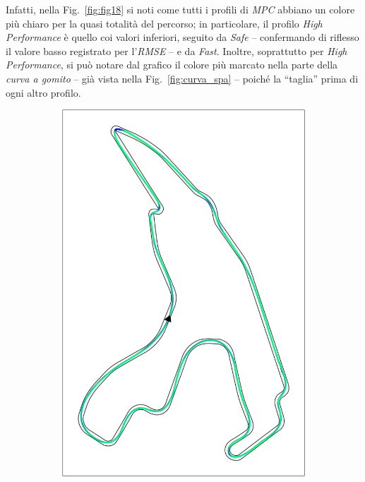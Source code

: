 Infatti, nella Fig.~\ref{fig:fig18} si noti
come tutti i profili di \textit{MPC} abbiano un colore più chiaro per 
la quasi totalità del percorso; in particolare, il profilo 
\textit{High Performance} è quello coi valori inferiori, seguito da 
\textit{Safe} -- confermando di riflesso il valore basso registrato per 
l'\textit{RMSE} -- e da \textit{Fast}. Inoltre, soprattutto per \textit{High Performance}, 
si può notare dal grafico il colore più marcato nella parte della 
\textit{curva a gomito} -- già vista nella Fig.~\ref{fig:curva_spa} -- 
poiché la ``taglia'' prima di ogni altro profilo.

\begin{figure}[H]
    \centering
    \begin{subfigure}[b]{0.3\textwidth}
        \centering
        \includegraphics[width=\textwidth]{images/spa_mpc_hp_crosstrack.png} 

\end{subfigure}
\end{figure}
